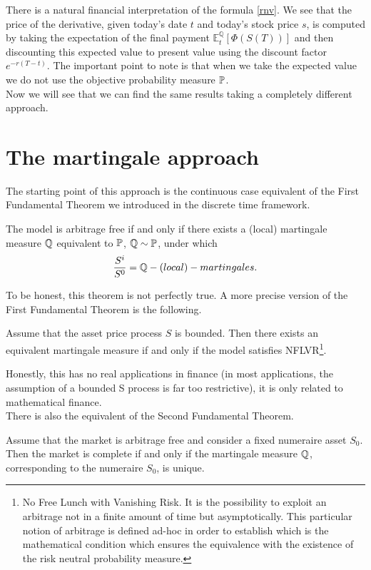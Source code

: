 There is a natural financial interpretation of the formula \eqref{rnv}. We see that the price of the derivative, given today’s date $t$ and today’s stock price $s$, is computed by taking the expectation of the final payment $\mathbb{E}^{\mathbb{Q}}_t [\Phi(S(T))]$ and then discounting this expected value to present value using the discount factor $e^{-r(T-t)}$. The important point to note is that when we take the expected value we do not use the objective probability measure $\mathbb{P}$.\\ %
Now we will see that we can find the same results taking a completely different approach.

\section{The martingale approach} %
The starting point of this approach is the continuous case equivalent of the First Fundamental Theorem we introduced in the discrete time framework.
\begin{theorem}
    The model is arbitrage free if and only if there exists a (local) martingale measure $\mathbb{Q}$ equivalent to $\mathbb{P}$, $\mathbb{Q}\sim\mathbb{P}$, under which
    \begin{equation}
        \dfrac{S^i}{S^0} = \mathbb{Q}-(local)-martingales.
    \end{equation}
\end{theorem}
To be honest, this theorem is not perfectly true. A more precise version of the First Fundamental Theorem is the following.
\begin{theorem}\label{firstfundth}
    Assume that the asset price process $S$ is bounded. Then there exists an equivalent martingale measure if and only if the model satisfies NFLVR\footnote{No Free Lunch with Vanishing Risk. It is the possibility to exploit an arbitrage not in a finite amount of time but asymptotically. This particular notion of arbitrage is defined ad-hoc in order to establish which is the mathematical condition which ensures the equivalence with the existence of the risk neutral probability measure.}.
\end{theorem}
Honestly, this has no real applications in finance (in most applications, the assumption of a bounded S process is far too restrictive), it is only related to mathematical finance.\\
There is also the equivalent of the Second Fundamental Theorem.
\begin{theorem}\label{secondfundth}
    Assume that the market is arbitrage free and consider a fixed numeraire asset $S_0$. Then the market is complete if and only if the martingale measure $\mathbb{Q}$, corresponding to the numeraire $S_0$, is unique.
\end{theorem}

